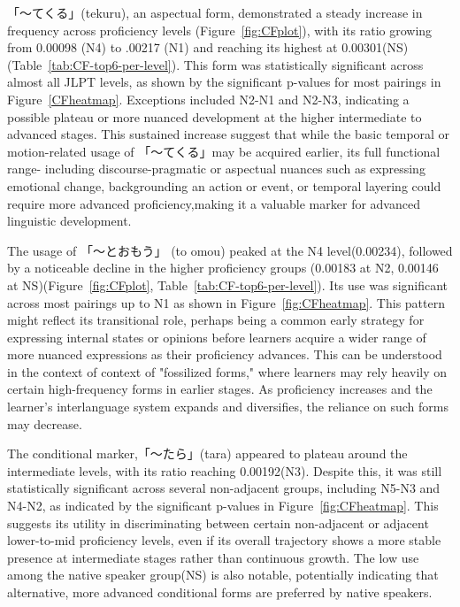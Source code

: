 「〜てくる」(tekuru), an aspectual form, demonstrated a steady increase in frequency across proficiency
levels (Figure~\ref{fig:CFplot}), with its ratio growing from 0.00098 (N4) to .00217 (N1) and reaching
its highest at 0.00301(NS) (Table~\ref{tab:CF-top6-per-level}). This form was
statistically significant across almost all JLPT levels, as shown by the significant p-values for most pairings in
Figure~\ref{CFheatmap}. Exceptions included N2-N1 and N2-N3, indicating a possible plateau or more nuanced
development at the higher intermediate to advanced stages. This sustained increase suggest that while the basic
temporal or motion-related usage of 「〜てくる」may be acquired earlier, its full functional range- including
discourse-pragmatic or aspectual nuances such as expressing emotional change, backgrounding an action or event, or
temporal layering could require more advanced proficiency,making it a valuable marker for advanced linguistic
development.

The usage of 「〜とおもう」 (to omou) peaked at the N4 level(0.00234), followed by a noticeable decline in the higher
proficiency
groups (0.00183 at N2, 0.00146 at NS)(Figure~\ref{fig:CFplot}, Table~\ref{tab:CF-top6-per-level}). Its
use was
significant across most pairings up to N1 as shown in Figure~\ref{fig:CFheatmap}. This pattern might reflect its
transitional
role, perhaps being a common early strategy for expressing
internal states or
opinions before learners acquire a wider range of more nuanced expressions as their proficiency advances. This can 
be understood in the context of \citet{selinker1972} context of "fossilized forms," where learners may rely heavily
on certain high-frequency forms in earlier stages. As proficiency increases and the learner's interlanguage system
expands and diversifies, the reliance on such forms may decrease.

The conditional marker,「〜たら」(tara) appeared to plateau  around the intermediate levels, with its ratio reaching
0.00192(N3). Despite this, it was still statistically significant across several
non-adjacent
groups, including N5-N3 and
N4-N2,
as indicated by the significant p-values in Figure~\ref{fig:CFheatmap}. This suggests its utility in discriminating
between certain non-adjacent or adjacent lower-to-mid proficiency levels, even if its overall trajectory shows a
more stable presence at intermediate stages rather than continuous growth. The low use among the native speaker
group(NS) is also notable, potentially indicating that alternative, more advanced conditional forms are preferred by
native speakers.

